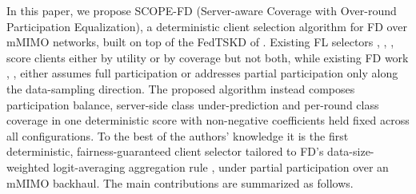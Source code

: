 \documentclass[journal]{IEEEtran}
\newcommand{\revIVE}[1]{#1}
\begin{document}
In this paper, we propose SCOPE-FD (Server-aware Coverage with Over-round Participation Equalization), a deterministic client selection algorithm for FD over mMIMO networks, built on top of the FedTSKD of \cite{mu2024fedtskd}. Existing FL selectors \cite{nishio2019client}, \cite{cho2020bandit}, \cite{xia2020mab}, \cite{balakrishnan2022divfl} score clients either by utility or by coverage but not both, while existing FD work \cite{mu2024fedtskd}, \cite{itahara2023distillation}, \cite{liu2022active} either assumes full participation or addresses partial participation only along the data-sampling direction. The proposed algorithm instead composes participation balance, server-side class under-prediction and per-round class coverage in one deterministic score \revIVE{with non-negative coefficients held fixed across all configurations}. To the best of the authors' knowledge it is the first deterministic, fairness-guaranteed client selector tailored to FD's data-size-weighted logit-averaging aggregation rule \cite{itahara2023distillation}, \cite{mu2024fedtskd} under partial participation over an mMIMO backhaul. The main contributions are summarized as follows.
\end{document}
